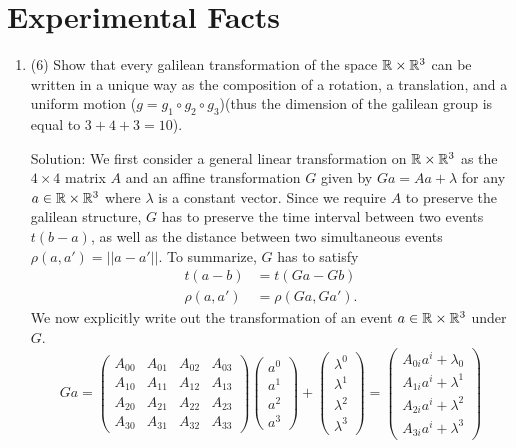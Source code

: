 \chapter{Experimental Facts}
\label{chap0}
\begin{enumerate}
	\item (6) Show that every galilean transformation of the space $ \mathbb{R}\times\mathbb{R}^3$ can be written in a unique way as the composition of a rotation, a translation, and a uniform motion ($ g = g_1 \circ g_2 \circ g_3 $)(thus the dimension of the galilean group is equal to $3+4+3 = 10$).\par
	
	Solution: We first consider a general linear transformation on $ \mathbb{R}\times\mathbb{R}^3$ as the $ 4\times 4 $ matrix $ A $ and an affine transformation $G$ given by $G a = A a+\lambda$ for any $a\in \mathbb{R}\times\mathbb{R}^3$ where $\lambda$ is a constant vector. Since we require $A$ to preserve the galilean structure, $G$ has to preserve the time interval between two events $t(b-a)$, as well as the distance between two simultaneous events $\rho (a, a') = ||a-a'||$. To summarize, $ G $ has to satisfy
	\begin{align}
		t(a-b) &= t(Ga-Gb)\\
		\rho(a,a') &= \rho(Ga, Ga').
	\end{align} 
	We now explicitly write out the transformation of an event $a\in \mathbb{R}\times \mathbb{R}^3$ under $G$.
	\begin{equation}
		Ga = \begin{pmatrix}
			A_{00} & A_{01} & A_{02} & A_{03}\\
			A_{10} & A_{11} & A_{12} & A_{13}\\
			A_{20} & A_{21} & A_{22} & A_{23}\\
			A_{30} & A_{31} & A_{32} & A_{33}
		\end{pmatrix}\begin{pmatrix}
		a^0\\ a^1\\ a^2\\ a^3 
	\end{pmatrix}+\begin{pmatrix}
	\lambda^0\\\lambda^1\\ \lambda^2\\\lambda^3
\end{pmatrix}
		= \begin{pmatrix}
			A_{0i}a^i+\lambda_0\\ A_{1i}a^i+\lambda^1 \\ A_{2i}a^i+\lambda^2\\A_{3i}a^i+\lambda^3

\end{pmatrix}
\end{equation}
\end{enumerate}
